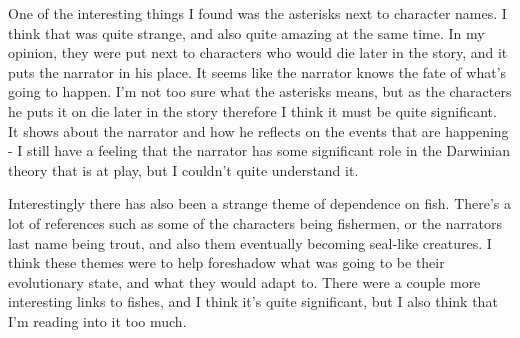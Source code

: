 \documentclass[11pt, oneside]{article}   	%
\begin{document}
\par One of the interesting things I found was the asterisks next to character names. I think that was quite strange, and also quite amazing at the same time. In my opinion, they were put next to characters who would die later in the story, and it puts the narrator in his place. It seems like the narrator knows the fate of what's going to happen. I'm not too sure what the asterisks means, but as the characters he puts it on die later in the story therefore I think it must be quite significant. It shows about the narrator and how he reflects on the events that are happening - I still have a feeling that the narrator has some significant role in the Darwinian theory that is at play, but I couldn't quite understand it.

\par Interestingly there has also been a strange theme of dependence on fish. There's a lot of references such as some of the characters being fishermen, or the narrators last name being trout, and also them eventually becoming seal-like creatures. I think these themes were to help foreshadow what was going to be their evolutionary state, and what they would adapt to. There were a couple more interesting links to fishes, and I think it's quite significant, but I also think that I'm reading into it too much. 
\end{document}
